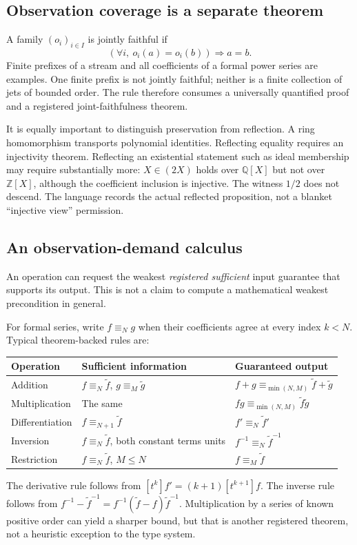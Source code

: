 \documentclass[11pt,a4paper]{article}
\newcommand{\code}[1]{\texttt{\detokenize{#1}}}
\newcommand{\Z}{\mathbb Z}
\newcommand{\Q}{\mathbb Q}
\theoremstyle{plain}
\theoremstyle{definition}
\begin{document}
\subsection{Observation coverage is a separate theorem}
A family $(o_i)_{i\in I}$ is jointly faithful if
\[
 (\forall i,\ o_i(a)=o_i(b))\Longrightarrow a=b.
\]
Finite prefixes of a stream and all coefficients of a formal power series are examples. One finite prefix is not jointly faithful; neither is a finite collection of jets of bounded order. The rule \code{conclude by all_prefixes} therefore consumes a universally quantified proof and a registered joint-faithfulness theorem.

It is equally important to distinguish preservation from reflection. A ring homomorphism transports polynomial identities. Reflecting equality requires an injectivity theorem. Reflecting an existential statement such as ideal membership may require substantially more: $X\in(2X)$ holds over $\Q[X]$ but not over $\Z[X]$, although the coefficient inclusion is injective. The witness $1/2$ does not descend. The language records the actual reflected proposition, not a blanket ``injective view'' permission.

\subsection{An observation-demand calculus}
An operation can request the weakest \emph{registered sufficient} input guarantee that supports its output. This is not a claim to compute a mathematical weakest precondition in general.

For formal series, write $f\equiv_N g$ when their coefficients agree at every index $k<N$. Typical theorem-backed rules are:
\begin{center}\small
\begin{tabularx}{\textwidth}{@{}L{30mm}Y Y@{}}
\toprule
Operation & Sufficient information & Guaranteed output\\
\midrule
Addition & $f\equiv_N\tilde f$, $g\equiv_M\tilde g$ & $f+g\equiv_{\min(N,M)}\tilde f+\tilde g$\\
Multiplication & The same & $fg\equiv_{\min(N,M)}\tilde f\tilde g$\\
Differentiation & $f\equiv_{N+1}\tilde f$ & $f'\equiv_N\tilde f'$\\
Inversion & $f\equiv_N\tilde f$, both constant terms units & $f^{-1}\equiv_N\tilde f^{-1}$\\
Restriction & $f\equiv_N\tilde f$, $M\le N$ & $f\equiv_M\tilde f$\\
\bottomrule
\end{tabularx}
\end{center}
The derivative rule follows from $[t^k]f'=(k+1)[t^{k+1}]f$. The inverse rule follows from
$f^{-1}-\tilde f^{-1}=f^{-1}(\tilde f-f)\tilde f^{-1}$.
Multiplication by a series of known positive order can yield a sharper bound, but that is another registered theorem, not a heuristic exception to the type system.
\end{document}
